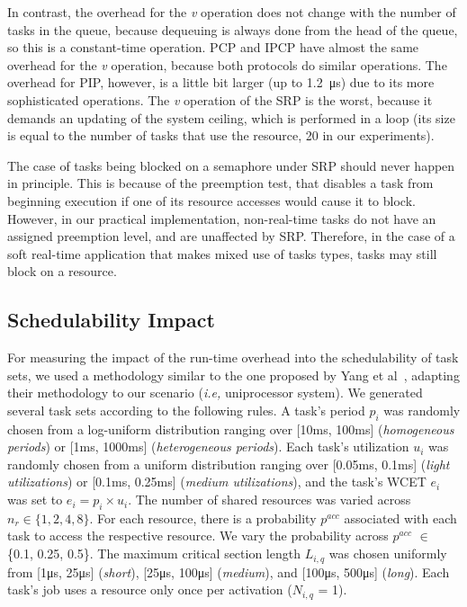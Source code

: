 
In contrast, the overhead for the \textit{v} operation does not change with the 
number of tasks in the queue, because dequeuing is always done from the head of 
the queue, so this is a constant-time operation. PCP and IPCP have almost the 
same overhead for the \emph{v} operation, because both protocols do similar 
operations. The overhead for PIP, however, is a little bit larger (up to 
1.2~\si{\micro\second}) due to its more sophisticated operations. The \emph{v} 
operation of the SRP is the worst, because it demands an updating of the system 
ceiling, which is performed in a loop (its size is equal to the number of 
tasks that use the resource, 20 in our experiments). 

The case of tasks being blocked on a semaphore under SRP should never happen in 
principle. This is because of the preemption test, that disables a task from 
beginning execution if one of its resource accesses would cause it to block. 
However, in our practical implementation, non-real-time tasks do not have an 
assigned preemption level, and are unaffected by SRP. Therefore, in the case of 
a soft real-time application that makes mixed use of tasks types, tasks may 
still block on a resource.

\subsection{Schedulability Impact}

For measuring the impact of the run-time overhead into the schedulability of 
task sets, we used a methodology similar to the one proposed 
by Yang et al~\cite{Yang:2015}, adapting their 
methodology to our scenario (\emph{i.e,} uniprocessor system). We generated 
several task sets according to the following rules. A task's period $p_i$ was 
randomly chosen from a log-uniform distribution ranging over 
[10\si{\milli\second}, 100\si{\milli\second}] (\emph{homogeneous periods}) or 
[1\si{\milli\second}, 1000\si{\milli\second}] (\emph{heterogeneous periods}). 
Each task's utilization $u_i$ was randomly chosen from a uniform distribution 
ranging over [0.05\si{\milli\second}, 0.1\si{\milli\second}] (\emph{light 
utilizations}) or [0.1\si{\milli\second}, 0.25\si{\milli\second}] 
(\emph{medium 
utilizations}), and the task's WCET $e_i$ was set to $e_i = p_i \times u_i$. 
The number of shared resources was varied across $n_r \in \{1, 2, 4, 8\}$. 
For each resource, there is a probability $p^{acc}$ associated with each task 
to access the respective resource. We vary the probability across $p^{acc}$ 
$\in$ \{0.1, 0.25, 0.5\}. The maximum critical section length $L_{i,q}$ was 
chosen uniformly from [1\si{\micro\second}, 25\si{\micro\second}] 
(\emph{short}), [25\si{\micro\second}, 100\si{\micro\second}] (\emph{medium}), 
and [100\si{\micro\second}, 500\si{\micro\second}] (\emph{long}).  Each task's 
job uses a resource only once per activation ($N_{i,q}$ = 1). 

